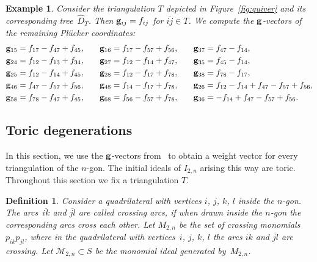 \documentclass[pdftex]{sigma}%
\newtheorem{Definition}[Theorem]{Definition}
\newtheorem{Example}[Theorem]{Example}
\numberwithin{equation}{section}
\begin{document}
\begin{Example}
Consider the triangulation $T$ depicted in Figure~\ref{fig:quiver} and its corresponding tree~$\widehat{D}_T$.
Then ${\bf g}_{ij}=f_{ij}$ for $\overline{ij}\in T$. We compute the ${\bf g}$-vectors of the remaining Pl\"ucker coordinates:
\begin{displaymath}
 \begin{split}
 {\bf g}_{15} & = f_{17}-f_{47}+f_{45},\\
 {\bf g}_{24} & = f_{12}-f_{13}+f_{34},\\
 {\bf g}_{25} & = f_{12}-f_{14}+f_{45},\\
 {\bf g}_{46} & =f_{47}-f_{57}+f_{56},\\
 {\bf g}_{58} & = f_{78} -f_{47} +f_{45},\\
 \end{split}
\quad\quad
 \begin{split}
 {\bf g}_{16} & = f_{17}-f_{57}+f_{56},\\
 {\bf g}_{27} & = f_{12}-f_{14}+f_{47},\\
 {\bf g}_{28} & = f_{12}-f_{17}+f_{78},\\
 {\bf g}_{48} & = f_{14}-f_{17}+f_{78},\\
 {\bf g}_{68} & = f_{56}-f_{57}+f_{78},\\
 \end{split}
 \quad\quad
 \begin{split}
{\bf g}_{37} & = f_{47}-f_{14},\\
{\bf g}_{35} & = f_{45}-f_{14},\\
{\bf g}_{38} & = f_{78}-f_{17},\\
{\bf g}_{26} & = f_{12}-f_{14}+f_{47}-f_{57}+f_{56},\\
{\bf g}_{36} & = -f_{14}+f_{47}-f_{57}+f_{56}.\\
\end{split}
\end{displaymath}
\end{Example}


\subsection{Toric degenerations}\label{sec: toric deg}
In this section, we use the ${\bf g}$-vectors from~ to obtain a weight vector for every triangulation of the $n$-gon.
The initial ideals of $I_{2,n}$ arising this way are toric.
Throughout this section we fix a triangulation $T$.

\begin{Definition}
Consider a quadrilateral with vertices $i$, $j$, $k$, $l$ inside the $n$-gon.
The arcs~$\overline{ik}$ and $\overline{jl}$ are called {\it crossing arcs}, if when drawn inside the $n$-gon the corresponding arcs cross each other.
Let $M_{2,n}$ be the set of {\it crossing monomials} $p_{ik}p_{jl}$, where in the quadrilateral with vertices~$i$, $j$, $k$, $l$ the arcs $\overline{ik}$ and $\overline{jl}$ are crossing.
Let $\mathcal M_{2,n}\subset S$ be the monomial ideal generated by~$M_{2,n}$.
\end{Definition}
\end{document}
